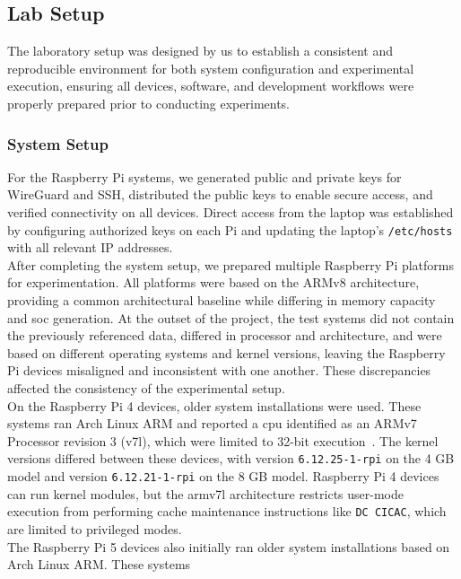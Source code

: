 \subsection{Lab Setup} \label{subsec:lab-setup}
  The laboratory setup was designed by us to establish a consistent and reproducible environment for both system 
  configuration and experimental execution, ensuring all devices, software, and development workflows were properly 
  prepared prior to conducting experiments.

  \subsubsection{System Setup} \label{subsubsec:system-setup}
    For the Raspberry Pi systems, we generated public and private keys for WireGuard and SSH, 
    distributed the public keys to enable secure access, and verified connectivity on all devices. 
    Direct access from the laptop was established by configuring authorized keys on each Pi and 
    updating the laptop's \texttt{/etc/hosts} with all relevant IP addresses.
    \\
    After completing the system setup, we prepared multiple Raspberry Pi platforms for 
    experimentation. All platforms were based on the ARMv8 architecture, 
    providing a common architectural baseline while differing in memory capacity and \gls{soc} generation.
    At the outset of the project, the test systems did not contain the previously referenced data, differed in processor 
    and architecture, and were based on different operating systems and kernel versions, 
    leaving the Raspberry Pi devices misaligned and inconsistent with one another. These 
    discrepancies affected the consistency of the experimental setup.
    \\
    On the Raspberry Pi 4 devices, older system installations were used. These systems ran Arch Linux ARM and reported 
    a \gls{cpu} identified as an ARMv7 Processor revision 3 (v7l), which were limited to 32-bit 
    execution~\cite{webARMandX86}. The kernel versions differed between 
    these devices, with version \texttt{6.12.25-1-rpi} on the 4 GB model and version \texttt{6.12.21-1-rpi} on the 8 GB model. 
    Raspberry Pi 4 devices can run kernel modules, but the armv7l architecture restricts user-mode execution from 
    performing cache maintenance instructions like \texttt{DC CICAC}, which are limited to privileged modes.
    \\
    The Raspberry Pi 5 devices also initially ran older system installations based on Arch Linux ARM. These systems 
